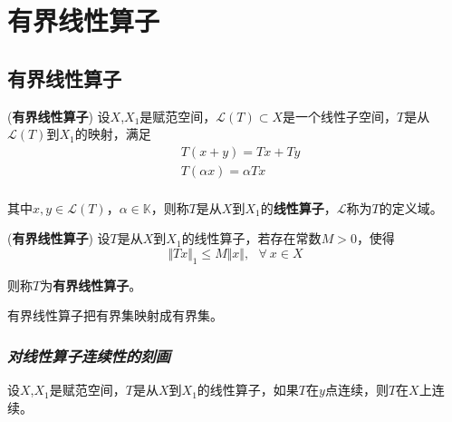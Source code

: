\chapter{有界线性算子}

\section{有界线性算子}

\begin{mdframed}
    \begin{define}(\textbf{有界线性算子})
        设$X$,$X_1$是赋范空间，$\mathcal{L}(T)\subset X$是一个线性子空间，$T$是从$\mathcal{L}(T)$到$X_1$的映射，满足
        \begin{equation}
            \begin{aligned}
                & T(x+y)=Tx+Ty \\
                & T(\alpha x)=\alpha Tx\\
            \end{aligned}
        \end{equation}

        其中$x,y\in \mathcal{L}(T)$，$\alpha\in \mathbb{K}$，则称$T$是从$X$到$X_1$的\textbf{线性算子}，$\mathcal{L}$称为$T$的定义域。
    \end{define}
\end{mdframed}

\begin{mdframed}
    \begin{define}
        (\textbf{有界线性算子}) 设$T$是从$X$到$X_1$的线性算子，若存在常数$M>0$，使得
        \begin{equation}
            \Vert Tx\Vert_1\leqslant M\Vert x\Vert,\ \ \ \forall\ x\in X
        \end{equation}

        则称$T$为\textbf{有界线性算子}。
    \end{define}
\end{mdframed}

有界线性算子把有界集映射成有界集。

\subsection*{\textsl{对线性算子连续性的刻画}}

\begin{mdframed}
    \begin{theorem}
        设$X$,$X_1$是赋范空间，$T$是从$X$到$X_1$的线性算子，如果$T$在$y$点连续，则$T$在$X$上连续。
    \end{theorem}
\end{mdframed}

